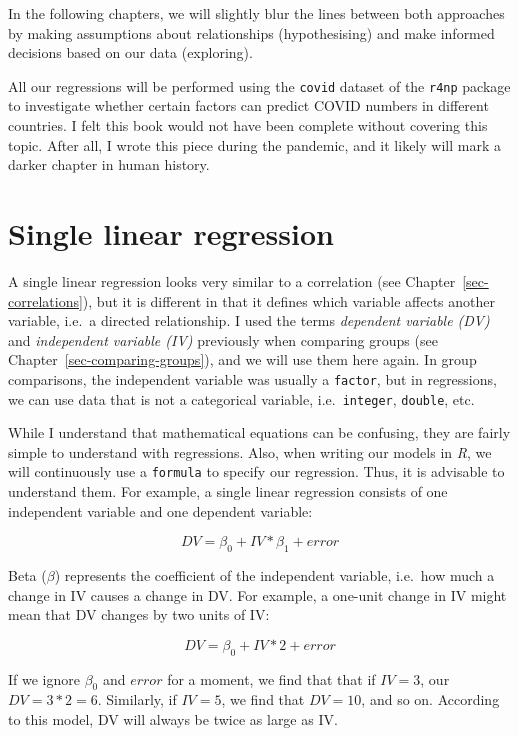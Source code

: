 \documentclass[
  letterpaper,
]{krantz}
\begin{document}
In the following chapters, we will slightly blur the lines between both
approaches by making assumptions about relationships (hypothesising) and
make informed decisions based on our data (exploring).

All our regressions will be performed using the \texttt{covid} dataset
of the \texttt{r4np} package to investigate whether certain factors can
predict COVID numbers in different countries. I felt this book would not
have been complete without covering this topic. After all, I wrote this
piece during the pandemic, and it likely will mark a darker chapter in
human history.

\section{Single linear regression}\label{sec-single-linear-regression}

A single linear regression looks very similar to a correlation (see
Chapter~\ref{sec-correlations}), but it is different in that it defines
which variable affects another variable, i.e.~a directed relationship. I
used the terms \emph{dependent variable (DV)} and \emph{independent
variable (IV)} previously when comparing groups (see
Chapter~\ref{sec-comparing-groups}), and we will use them here again. In
group comparisons, the independent variable was usually a
\texttt{factor}, but in regressions, we can use data that is not a
categorical variable, i.e.~\texttt{integer}, \texttt{double}, etc.

While I understand that mathematical equations can be confusing, they
are fairly simple to understand with regressions. Also, when writing our
models in \emph{R}, we will continuously use a \texttt{formula} to
specify our regression. Thus, it is advisable to understand them. For
example, a single linear regression consists of one independent variable
and one dependent variable:

\[
DV = \beta_{0} + IV * \beta_{1} + error
\]

Beta (\(\beta\)) represents the coefficient of the independent variable,
i.e.~how much a change in IV causes a change in DV. For example, a
one-unit change in IV might mean that DV changes by two units of IV:

\label{single-linear-regression-example}
\[
DV = \beta_0 + IV * 2 + error
\]

If we ignore \(\beta_0\) and \(error\) for a moment, we find that that
if \(IV = 3\), our \(DV = 3*2 = 6\). Similarly, if \(IV = 5\), we find
that \(DV = 10\), and so on. According to this model, DV will always be
twice as large as IV.
\end{document}
